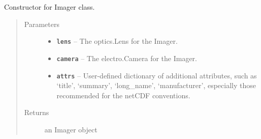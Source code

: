 \documentclass[a4paper,10pt,english]{sphinxmanual}
\begin{document}
\begin{fulllineitems}
\begin{fulllineitems}
\label{packages:electro.Imager.__init__}
Constructor for Imager class.
\begin{quote}\begin{description}
\item[{Parameters}] \leavevmode\begin{itemize}
\item {} 
\textbf{\texttt{lens}} -- The optics.Lens for the Imager.

\item {} 
\textbf{\texttt{camera}} -- The electro.Camera for the Imager.

\item {} 
\textbf{\texttt{attrs}} -- User-defined dictionary of additional attributes, such as `title', `summary', `long\_name',
`manufacturer', especially those recommended for the netCDF conventions.

\end{itemize}

\item[{Returns}] \leavevmode
an Imager object

\end{description}\end{quote}

\end{fulllineitems}


\end{fulllineitems}

\end{document}
